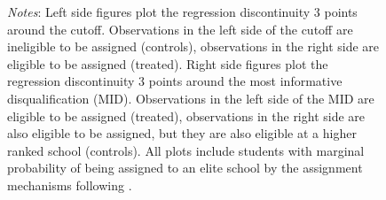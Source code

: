 \documentclass[oneside,11pt]{article}
\begin{document}
\begin{figure}[H]
\footnotesize
\textit{Notes}: Left side figures plot the regression discontinuity 3 points around the cutoff. Observations in the left side of the cutoff are ineligible to be assigned (controls), observations in the right side are eligible to be assigned (treated). Right side figures plot the regression discontinuity 3 points around the most informative disqualification (MID). Observations in the left side of the MID are eligible to be assigned (treated), observations in the right side are also eligible to be assigned, but they are also eligible at a higher ranked school (controls). All plots include students with marginal probability of being assigned to an elite school by the assignment mechanisms following \citet{abdulkadirouglu2022breaking}. 
\end{figure}


\clearpage

\end{document}
